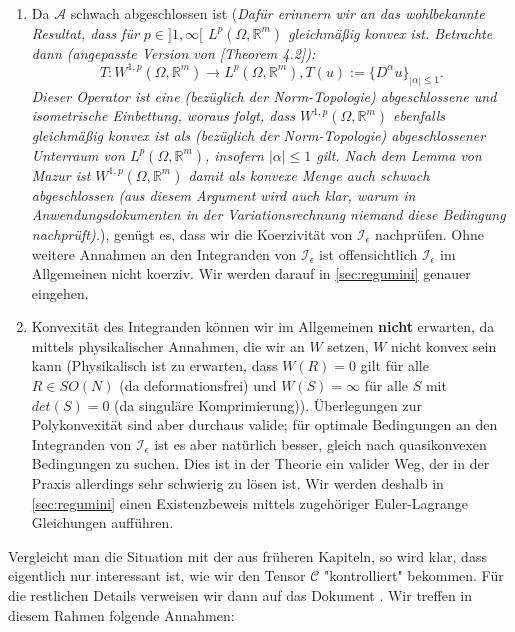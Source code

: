 \begin{enumerate}
    \item Da \(\mathcal{A}\) schwach abgeschlossen ist (\textit{Dafür erinnern wir an das wohlbekannte Resultat, dass für \(p \in ]1,\infty[\) \(L^p(\Omega,\mathbb{R}^m)\) gleichmäßig konvex ist. Betrachte dann (angepasste Version von \cite{marcellan2018weighted}[Theorem 4.2]):
    \begin{equation}
        T : W^{1,p}(\Omega,\mathbb{R}^m) \to L^p(\Omega,\mathbb{R}^m), T(u) := \{D^{\alpha}u\}_{|\alpha| \leq 1}.
    \end{equation}
    Dieser Operator ist eine (bezüglich der Norm-Topologie) abgeschlossene und isometrische Einbettung, woraus folgt, dass \(W^{1,p}(\Omega,\mathbb{R}^m)\) ebenfalls gleichmäßig konvex ist als (bezüglich der Norm-Topologie) abgeschlossener Unterraum von \(L^p(\Omega,\mathbb{R}^m)\), insofern \(|\alpha| \leq 1\) gilt. Nach dem Lemma von Mazur ist \(W^{1,p}(\Omega,\mathbb{R}^m)\) damit als konvexe Menge auch schwach abgeschlossen (aus diesem Argument wird auch klar, warum in Anwendungsdokumenten in der Variationsrechnung niemand diese Bedingung nachprüft).}), genügt es, dass wir die Koerzivität von \(\mathcal{I}_{\epsilon}\) nachprüfen. Ohne weitere Annahmen an den Integranden von \(\mathcal{I}_{\epsilon}\) ist offensichtlich \(\mathcal{I}_{\epsilon}\) im Allgemeinen nicht koerziv. Wir werden darauf in \ref{sec:regumini} genauer eingehen.
    \item Konvexität des Integranden können wir im Allgemeinen \textbf{nicht} erwarten, da mittels physikalischer Annahmen, die wir an \(W\) setzen, \(W\) nicht konvex sein kann (Physikalisch ist zu erwarten, dass \(W(R) = 0\) gilt für alle \(R \in SO(N)\) (da deformationsfrei) und \(W(S) = \infty\) für alle \(S\) mit \(det (S) = 0\) (da singuläre Komprimierung)). Überlegungen zur Polykonvexität sind aber durchaus valide; für optimale Bedingungen an den Integranden von \(\mathcal{I}_{\epsilon}\) ist es aber natürlich besser, gleich nach quasikonvexen Bedingungen zu suchen. Dies ist in der Theorie ein valider Weg, der in der Praxis allerdings sehr schwierig zu lösen ist. Wir werden deshalb in \ref{sec:regumini} einen Existenzbeweis mittels zugehöriger Euler-Lagrange Gleichungen aufführen.
\end{enumerate}
Vergleicht man die Situation mit der aus früheren Kapiteln, so wird klar, dass eigentlich nur interessant ist, wie wir den Tensor \(\mathcal{C}\) "kontrolliert" bekommen. Für die restlichen Details verweisen wir dann auf das Dokument \cite{Stinson_2021}. Wir treffen in diesem Rahmen folgende Annahmen:

